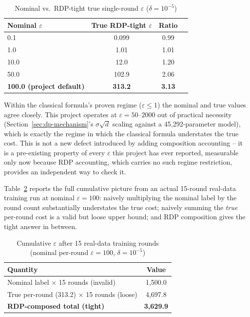 \documentclass[12pt]{svproc}
\begin{document}
\begin{table}[!t]
\caption{Nominal vs.\ RDP-tight true single-round $\varepsilon$ ($\delta=10^{-5}$)}
\label{tab:eps-correction}
\centering
\begin{tabular}{@{}lccc@{}}
\toprule
Nominal $\varepsilon$ & True RDP-tight $\varepsilon$ & Ratio \\
\midrule
0.1   & 0.099   & 0.99 \\
1.0   & 1.01    & 1.01 \\
10.0  & 12.0    & 1.20 \\
50.0  & 102.9   & 2.06 \\
\textbf{100.0 (project default)} & \textbf{313.2} & \textbf{3.13} \\
\bottomrule
\end{tabular}
\end{table}

Within the classical formula's proven regime ($\varepsilon \le 1$) the
nominal and true values agree closely. This project operates at
$\varepsilon = 50$--$2000$ out of practical necessity
(Section~\ref{sec:dp-mechanism}'s $\sigma\sqrt{d}$ scaling against a
45{,}292-parameter model), which is exactly the regime in which the
classical formula understates the true cost. This is not a new defect
introduced by adding composition accounting -- it is a pre-existing
property of every $\varepsilon$ this project has ever reported,
measurable only now because RDP accounting, which carries no such
regime restriction, provides an independent way to check it.

Table~\ref{tab:accounting-real} reports the full cumulative picture
from an actual 15-round real-data training run at nominal
$\varepsilon=100$: naively multiplying the nominal label by the round
count substantially understates the true cost; naively summing the
\emph{true} per-round cost is a valid but loose upper bound; and
RDP composition gives the tight answer in between.

\begin{table}[!t]
\caption{Cumulative $\varepsilon$ after 15 real-data training rounds (nominal per-round $\varepsilon=100$, $\delta=10^{-5}$)}
\label{tab:accounting-real}
\centering
\begin{tabular}{@{}lc@{}}
\toprule
Quantity & Value \\
\midrule
Nominal label $\times$ 15 rounds (invalid) & 1{,}500.0 \\
True per-round (313.2) $\times$ 15 rounds (loose) & 4{,}697.8 \\
\textbf{RDP-composed total (tight)} & \textbf{3{,}629.9} \\
\bottomrule
\end{tabular}
\end{table}
\end{document}
